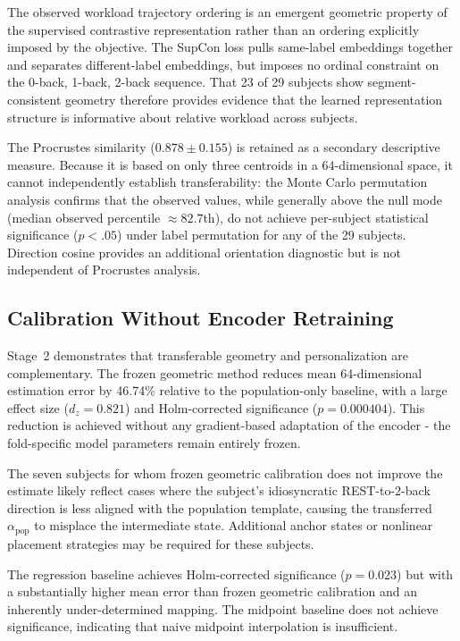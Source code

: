 \documentclass{ieeeaccess}
\begin{document}
The observed workload trajectory ordering is an emergent geometric property of
the supervised contrastive representation rather than an ordering explicitly
imposed by the objective. The SupCon loss pulls same-label embeddings together
and separates different-label embeddings, but imposes no ordinal constraint
on the 0-back, 1-back, 2-back sequence. That 23 of 29 subjects show
segment-consistent geometry therefore provides evidence that the learned
representation structure is informative about relative workload across subjects.

The Procrustes similarity ($0.878\pm0.155$) is retained as a secondary
descriptive measure. Because it is based on only three centroids in a
64-dimensional space, it cannot independently establish transferability:
the Monte Carlo permutation analysis confirms that the observed values, while
generally above the null mode (median observed percentile $\approx82.7$th),
do not achieve per-subject statistical significance ($p<.05$) under label
permutation for any of the 29 subjects. Direction cosine provides an
additional orientation diagnostic but is not independent of Procrustes
analysis.

\subsection{Calibration Without Encoder Retraining}

Stage~2 demonstrates that transferable geometry and personalization are
complementary. The frozen geometric method reduces mean 64-dimensional
estimation error by 46.74\% relative to the population-only baseline, with
a large effect size ($d_z=0.821$) and Holm-corrected significance
($p=0.000404$). This reduction is achieved without any gradient-based
adaptation of the encoder - the fold-specific model parameters remain
entirely frozen.

The seven subjects for whom frozen geometric calibration does not improve
the estimate likely reflect cases where the subject's idiosyncratic REST-to-2-back
direction is less aligned with the population template, causing the transferred
$\alpha_{\mathrm{pop}}$ to misplace the intermediate state. Additional anchor
states or nonlinear placement strategies may be required for these subjects.

The regression baseline achieves Holm-corrected significance ($p=0.023$) but
with a substantially higher mean error than frozen geometric calibration and
an inherently under-determined mapping. The midpoint baseline does not achieve
significance, indicating that naive midpoint interpolation is insufficient.
\end{document}
